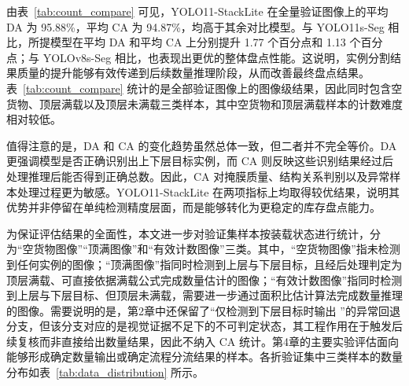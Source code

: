 由表~\ref{tab:count_compare} 可见，YOLO11-StackLite 在全量验证图像上的平均 DA 为 95.88\%，平均 CA 为 94.87\%，均高于其余对比模型。与 YOLO11s-Seg 相比，所提模型在平均 DA 和平均 CA 上分别提升 1.77 个百分点和 1.13 个百分点；与 YOLOv8s-Seg 相比，也表现出更优的整体盘点性能。这说明，实例分割结果质量的提升能够有效传递到后续数量推理阶段，从而改善最终盘点结果。表~\ref{tab:count_compare} 统计的是全部验证图像上的图像级结果，因此同时包含空货物、顶层满载以及顶层未满载三类样本，其中空货物和顶层满载样本的计数难度相对较低。

值得注意的是，DA 和 CA 的变化趋势虽然总体一致，但二者并不完全等价。DA 更强调模型是否正确识别出上下层目标实例，而 CA 则反映这些识别结果经过后处理推理后能否得到正确总数。因此，CA 对掩膜质量、结构关系判别以及异常样本处理过程更为敏感。YOLO11-StackLite 在两项指标上均取得较优结果，说明其优势并非停留在单纯检测精度层面，而是能够转化为更稳定的库存盘点能力。

为保证评估结果的全面性，本文进一步对验证集样本按装载状态进行统计，分为“空货物图像”“顶满图像”和“有效计数图像”三类。其中，“空货物图像”指未检测到任何实例的图像；“顶满图像”指同时检测到上层与下层目标，且经后处理判定为顶层满载、可直接依据满载公式完成数量估计的图像；“有效计数图像”指同时检测到上层与下层目标、但顶层未满载，需要进一步通过面积比估计算法完成数量推理的图像。需要说明的是，第2章中还保留了“仅检测到下层目标时输出 ”的异常回退分支，但该分支对应的是视觉证据不足下的不可判定状态，其工程作用在于触发后续复核而非直接给出数量结果，因此不纳入 CA 统计。第4章的主要实验评估面向能够形成确定数量输出或确定流程分流结果的样本。各折验证集中三类样本的数量分布如表~\ref{tab:data_distribution} 所示。

\begin{table}[htbp]
  \label{tab:data_distribution}
  \centering
  \small
\end{table}

